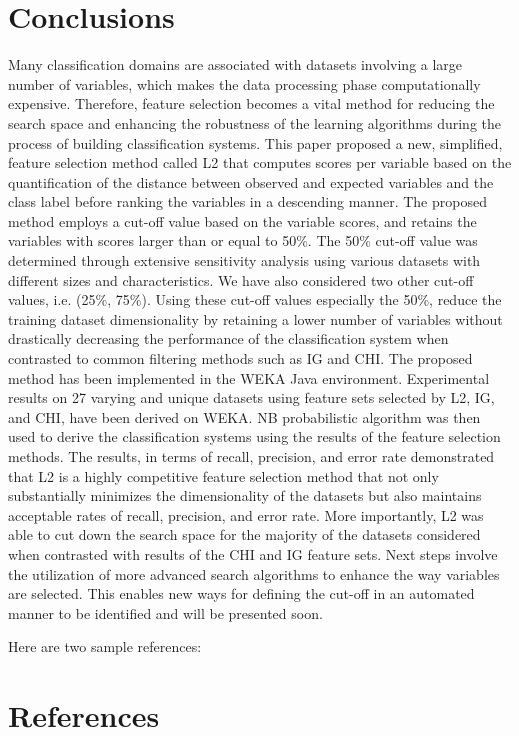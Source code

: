 \documentclass[review]{elsarticle}
\begin{document}
\section{Conclusions }

Many classification domains are associated with datasets involving a large number of variables, which makes the data processing phase computationally expensive. Therefore, feature selection becomes a vital method for reducing the search space and enhancing the robustness of the learning algorithms during the process of building classification systems. This paper proposed a new, simplified, feature selection method called L2 that computes scores per variable based on the quantification of the distance between observed and expected variables and the class label before ranking the variables in a descending manner. The proposed method employs a cut-off value based on the variable scores, and retains the variables with scores larger than or equal to 50\%. The 50\% cut-off value was determined through extensive sensitivity analysis using various datasets with different sizes and characteristics. We have also considered two other cut-off values, i.e. (25\%, 75\%). Using these cut-off values especially the 50\%, reduce the training dataset dimensionality by retaining a lower number of variables without drastically decreasing the performance of the classification system when contrasted to common filtering methods such as IG and CHI.  The proposed method has been implemented in the WEKA Java environment. Experimental results on 27 varying and unique datasets using feature sets selected by L2, IG, and CHI, have been derived on WEKA. NB probabilistic algorithm was then used to derive the classification systems using the results of the feature selection methods. The results, in terms of recall, precision, and error rate demonstrated that L2 is a highly competitive feature selection method that not only substantially minimizes the dimensionality of the datasets but also maintains acceptable rates of recall, precision, and error rate. More importantly, L2 was able to cut down the search space for the majority of the datasets considered when contrasted with results of the CHI and IG feature sets.  Next steps involve the utilization of more advanced search algorithms to enhance the way variables are selected.  This enables new ways for defining the cut-off in an automated manner to be identified and will be presented soon.  


Here are two sample references:

\cite{Kamalov2017,Kamalov2017a,McCluskey2014,Bunker2019,Chandrashekar2014,Abdelhamid2017,Hall1999}

\section*{References}


\end{document}
